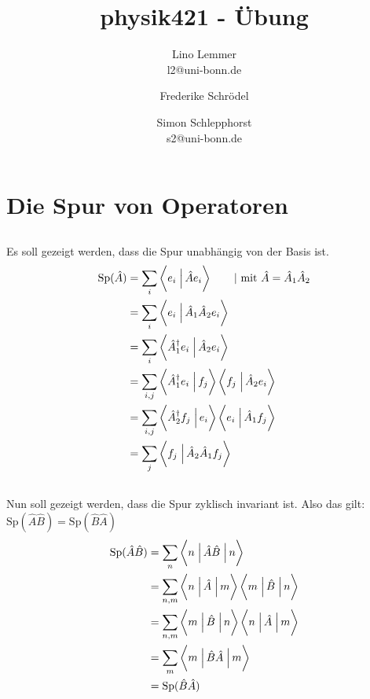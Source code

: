

\setcounter{thezettel}{4}
\renewcommand\thesection{\arabic{thezettel}.\arabic{section}}


\title{physik421 - Übung }
\author{Lino Lemmer \\ \small{l2@uni-bonn.de} \and Frederike Schrödel \and Simon Schlepphorst\\ \small{s2@uni-bonn.de}}


\maketitle

\section{Die Spur von Operatoren}
\subsection{}
Es soll gezeigt werden, dass die Spur unabhängig von der Basis ist.
\begin{align*}
    \text{Sp}(\hat A) &= \sum_i \braket{e_i}{\hat Ae_i} \qquad|\text{ mit } \hat A=\hat A_1\hat A_2 \\
                      &= \sum_i \braket{e_i}{\hat A_1\hat A_2e_i} \\
                      &= \sum_i \braket{\hat A_1^\dagger e_i}{\hat A_2e_i} \\
                      &= \sum_{i,j} \braket{\hat A_1^\dagger e_i}{ f_j } \braket{f_j}{\hat A_2e_i} \\
                      &= \sum_{i,j}\braket{\hat A_2^\dagger f_j}{e_i} \braket{e_i}{\hat A_1f_j} \\
                      &= \sum_j \braket{f_j}{\hat A_2\hat A_1f_j} \\
\end{align*}

\subsection{}
Nun soll gezeigt werden, dass die Spur zyklisch invariant ist.
Also das gilt: $\text{Sp}(\hat A\hat B) = \text{Sp}(\hat B\hat A)$
\begin{align*}
    \text{Sp}(\hat A\hat B) &= \sum_n \braopket{n}{\hat A\hat B}{n} \\
                           &= \sum_{n,m} \braopket{n}{\hat A}{m} \braopket{m}{\hat B}{n} \\
                           &= \sum_{n,m} \braopket{m}{\hat B}{n}\braopket{n}{\hat A}{m} \\
                           &= \sum_m \braopket{m}{\hat B\hat A}{m} \\
                           &=\text{Sp}(\hat B\hat A)
\end{align*}


